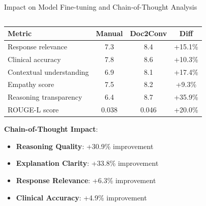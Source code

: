 \begin{frame}{Impact on Model Fine-tuning and Chain-of-Thought Analysis}
  \begin{columns}
    \begin{column}{0.8\textwidth}
      \footnotesize
      \begin{table}
        \centering
        \begin{tabular}{|l|c|c|c|}
          \hline
          \textbf{Metric} & \textbf{Manual} & \textbf{Doc2Conv} & \textbf{Diff} \\
          \hline
          Response relevance & 7.3 & 8.4 & +15.1\% \\
          Clinical accuracy & 7.8 & 8.6 & +10.3\% \\
          Contextual understanding & 6.9 & 8.1 & +17.4\% \\
          Empathy score & 7.5 & 8.2 & +9.3\% \\
          Reasoning transparency & 6.4 & 8.7 & +35.9\% \\
          ROUGE-L score & 0.038 & 0.046 & +20.0\% \\
          \hline
        \end{tabular}
      \end{table}
      
      \vspace{0.2cm}
      \footnotesize
      \textbf{Chain-of-Thought Impact}:
      \begin{itemize}
        \item \textbf{Reasoning Quality}: +30.9\% improvement
        \item \textbf{Explanation Clarity}: +33.8\% improvement
        \item \textbf{Response Relevance}: +6.3\% improvement
        \item \textbf{Clinical Accuracy}: +4.9\% improvement
      \end{itemize}
    \end{column}
  \end{columns}
\end{frame}

